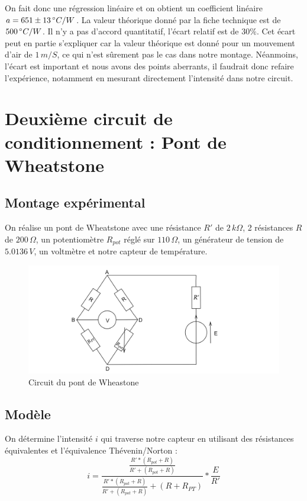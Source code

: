 \documentclass[12pt]{article}
\begin{document}
 On fait donc une régression linéaire et on obtient  un coefficient linéaire $a=651\pm 13\, \degree C/W$. La valeur théorique donné par la fiche technique est de $500\, \degree C/W$. Il n'y a pas d'accord quantitatif, l'écart relatif est de $30\%$. Cet écart peut en partie s'expliquer car la valeur théorique est donné pour un mouvement d'air de $1\, m/S$, ce qui n'est sûrement pas le cas dans notre montage. Néanmoins, l'écart est important et nous avons des points aberrants, il faudrait donc refaire l'expérience, notamment en mesurant directement l'intensité dans notre circuit. 

\section{Deuxième circuit de conditionnement : Pont de Wheatstone}
\subsection{Montage expérimental}

On réalise un pont de Wheatstone avec une résistance $R'$ de $2\, k\Omega$, 2 résistances $R$ de $200\,\Omega$, un potentiomètre $R_{pot}$ réglé sur $110\, \Omega$, un générateur de tension de $5.0136\, V$, un voltmètre et notre capteur de température. 

\begin{figure}[h!]
	\begin{center}
		\includegraphics[scale=0.2]{Wheatstone.png}
		\caption{Circuit du pont de Wheastone}
		\label{Wheatstone}
	\end{center}
\end{figure}

\subsection{Modèle}

On détermine l'intensité $i$ qui traverse notre capteur en utilisant des résistances équivalentes et l'équivalence Thévenin/Norton :
\begin{equation}
i=\frac{\frac{R'*(R_{pot}+R)}{R'+(R_{pot}+R)}}{\frac{R'*(R_{pot}+R)}{R'+(R_{pot}+R)}+(R+R_{PT})}*\frac{E}{R'}
\label{Intensité_wheatstone}
\end{equation}
\end{document}
